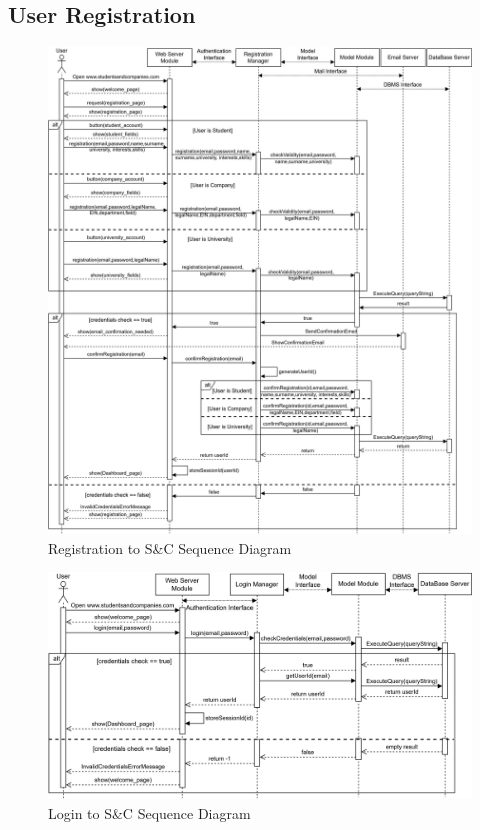 \subsection{User Registration}\label{subsec:user registration}
\begin{figure}[H]
    \centering
    \includegraphics[width=1\textwidth]{Images/Runtime_view/registration_SD.png}
    \caption{Registration to S\&C Sequence Diagram}
\end{figure}
\begin{figure}[H]
    \centering
    \includegraphics[width=1\textwidth]{Images/Runtime_view/login_SD.png}
    \caption{Login to S\&C Sequence Diagram}
\end{figure}
